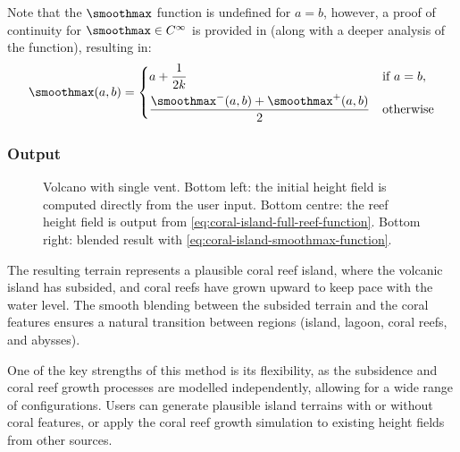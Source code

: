 Note that the $\smoothmax$ function is undefined for $a = b$, however, a proof of continuity for $\smoothmax \in C^\infty$ is provided in  (along with a deeper analysis of the function), resulting in:
\begin{align}
    \label{eq:coral-island-smoothmax-function}
    \smoothmax(a, b) = \begin{dcases}
        a + \frac{1}{2k} & \text{if } a = b, \\
        \frac{\smoothmax^-(a, b) + \smoothmax^+(a, b)}{2} & \text{otherwise}
    \end{dcases}
\end{align}

\subsubsection{Output}
\label{sec:coral-island-procedural-output}

\begin{figure}
    \caption{Volcano with single vent. Bottom left: the initial height field is computed directly from the user input. Bottom centre: the reef height field is output from \cref{eq:coral-island-full-reef-function}. Bottom right: blended result with \cref{eq:coral-island-smoothmax-function}.}
    \label{fig:coral-island-volcano-example}
\end{figure}

The resulting terrain represents a plausible coral reef island, where the volcanic island has subsided, and coral reefs have grown upward to keep pace with the water level. The smooth blending between the subsided terrain and the coral features ensures a natural transition between regions (island, lagoon, coral reefs, and abysses).

One of the key strengths of this method is its flexibility, as the subsidence and coral reef growth processes are modelled independently, allowing for a wide range of configurations. Users can generate plausible island terrains with or without coral features, or apply the coral reef growth simulation to existing height fields from other sources.




